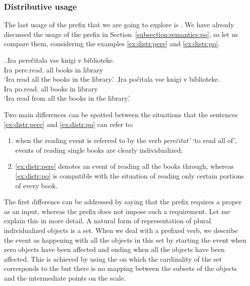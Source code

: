 \subsubsection{Distributive usage}
The last usage of the prefix  that we are going to explore is . We have already discussed the  usage of the prefix  in Section~\ref{subsection:semantics:po}, so let us compare them, considering the examples \ref{ex:distr:pere} and \ref{ex:distr:po}.

\ex.\ag.\label{ex:distr:pere}Ira pere\v{c}itala vse knigi v biblioteke.\\
Ira pere.read. all books in library\\
\trans `Ira read all the books in the library.'
\bg.\label{ex:distr:po}Ira po\v{c}itala vse knigi v biblioteke.\\
Ira po.read. all books in library\\
\trans `Ira read from all the books in the library.'

Two main differences can be spotted between the situations that the sentences \ref{ex:distr:pere} and \ref{ex:distr:po} can refer to:
\begin{enumerate}
\item when the reading event is referred to by the verb \textit{pere\v{c}itat'} `to read all of', events of reading single books are clearly individualized;
\item \ref{ex:distr:pere} denotes an event of reading all the books through, whereas \ref{ex:distr:po} is compatible with the situation of reading only certain portions of every book.
\end{enumerate}

The first difference can be addressed by saying that the prefix  requires a proper  as an input, whereas the prefix  does not impose such a requirement. Let me explain this in more detail. A natural form of representation of plural individualized objects is a set. When we deal with a prefixed verb, we describe the event as happening with all the objects in this set by starting the event when zero objects have been affected and ending when all the objects have been affected. This is achieved by using the  on which the cardinality of the set corresponds to the  but there is no mapping between the subsets of the objects and the intermediate points on the scale.

